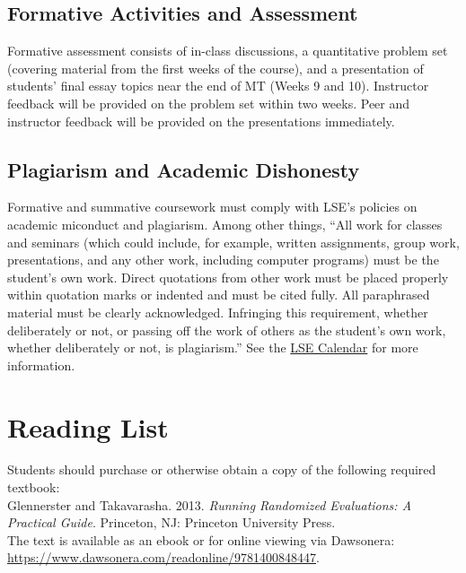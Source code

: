 \documentclass[12pt,a4paper]{article}
\begin{document}
\subsection{Formative Activities and Assessment}

Formative assessment consists of in-class discussions, a quantitative problem set (covering material from the first weeks of the course), and a presentation of students' final essay topics near the end of MT (Weeks 9 and 10). Instructor feedback will be provided on the problem set within two weeks. Peer and instructor feedback will be provided on the presentations immediately.


\subsection{Plagiarism and Academic Dishonesty}

Formative and summative coursework must comply with LSE's policies on academic miconduct and plagiarism. Among other things, ``All work for classes and seminars (which could include, for example, written assignments, group work, presentations, and any other work, including computer programs) must be the student's own work. Direct quotations from other work must be placed properly within quotation marks or indented and must be cited fully. All paraphrased material must be clearly acknowledged. Infringing this requirement, whether deliberately or not, or passing off the work of others as the student’s own work, whether deliberately or not, is plagiarism.'' See the \href{http://www.lse.ac.uk/resources/calendar/undergraduate.htm}{LSE Calendar} for more information.



\section{Reading List}

Students should purchase or otherwise obtain a copy of the following required textbook:\\

\noindent Glennerster and Takavarasha. 2013. \textit{Running Randomized Evaluations: A Practical Guide}. Princeton, NJ: Princeton University Press.\\

\noindent The text is available as an ebook or for online viewing via Dawsonera:\\

\url{https://www.dawsonera.com/readonline/9781400848447}.\\
\end{document}

